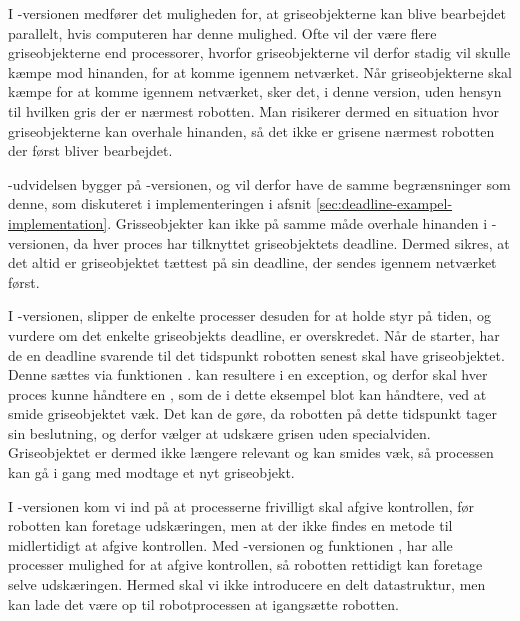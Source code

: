 I -versionen medfører det  muligheden for, at griseobjekterne kan blive  bearbejdet parallelt, hvis computeren har denne mulighed.  Ofte vil der være flere griseobjekterne end processorer, hvorfor griseobjekterne vil derfor stadig vil skulle kæmpe mod hinanden, for at komme igennem netværket. Når griseobjekterne skal kæmpe for at komme igennem netværket, sker det, i denne version, uden hensyn til hvilken gris der er nærmest robotten. Man risikerer dermed en situation hvor griseobjekterne kan overhale hinanden, så det ikke er grisene nærmest robotten der først bliver bearbejdet.

-udvidelsen bygger på -versionen, og vil derfor have de samme begrænsninger som denne, som diskuteret i implementeringen i afsnit \cref{sec:deadline-exampel-implementation}. Grisseobjekter kan ikke  på samme måde overhale hinanden i -versionen, da hver proces har tilknyttet griseobjektets deadline. Dermed sikres, at det altid er griseobjektet tættest på sin deadline, der sendes igennem netværket først.

I -versionen, slipper de enkelte processer desuden for at holde styr på tiden, og vurdere om det enkelte griseobjekts deadline, er overskredet. Når de starter, har de en deadline svarende til det tidspunkt robotten senest skal have griseobjektet. Denne sættes via funktionen .  kan resultere i en exception, og derfor skal hver proces kunne håndtere en , som de i dette eksempel blot kan håndtere, ved at smide griseobjektet væk. Det kan de gøre, da robotten på dette tidspunkt tager sin beslutning, og derfor vælger at udskære grisen uden specialviden. Griseobjektet er dermed ikke længere relevant og kan smides væk, så processen kan gå i gang med modtage et nyt griseobjekt.

I -versionen kom vi ind på at processerne frivilligt skal afgive kontrollen, før robotten kan foretage udskæringen, men at der ikke findes en metode til midlertidigt at afgive kontrollen. Med -versionen og funktionen , har alle processer mulighed for at afgive kontrollen, så robotten rettidigt kan foretage selve udskæringen. Hermed skal vi ikke introducere en delt datastruktur, men kan lade det være op til robotprocessen at igangsætte robotten.
  
